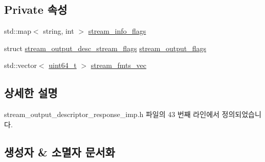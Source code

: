 \subsection*{Private 속성}
\begin{DoxyCompactItemize}
\item 
std\+::map$<$ string, int $>$ \hyperlink{classavdecc__lib_1_1stream__output__descriptor__response__imp_a7a5f929ce40eaf804944218314bff706}{stream\+\_\+info\+\_\+flags}
\item 
struct \hyperlink{structavdecc__lib_1_1stream__output__descriptor__response__imp_1_1stream__output__desc__stream__flags}{stream\+\_\+output\+\_\+desc\+\_\+stream\+\_\+flags} \hyperlink{classavdecc__lib_1_1stream__output__descriptor__response__imp_a46da0a71335bf6463cafb4c34ac12e27}{stream\+\_\+output\+\_\+flags}
\item 
std\+::vector$<$ \hyperlink{parse_8c_aec6fcb673ff035718c238c8c9d544c47}{uint64\+\_\+t} $>$ \hyperlink{classavdecc__lib_1_1stream__output__descriptor__response__imp_a1fd13ea03cfad2d7e41d304eb40af49a}{stream\+\_\+fmts\+\_\+vec}
\end{DoxyCompactItemize}


\subsection{상세한 설명}


stream\+\_\+output\+\_\+descriptor\+\_\+response\+\_\+imp.\+h 파일의 43 번째 라인에서 정의되었습니다.



\subsection{생성자 \& 소멸자 문서화}
